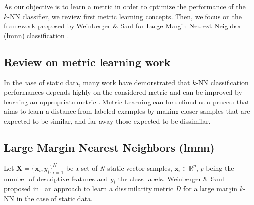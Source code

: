 As our objective is to learn a metric in order to optimize the performance of the $k$-NN classifier, we review first metric learning concepts. Then, we focus on the framework proposed by Weinberger \& Saul for Large Margin Nearest Neighbor ({\sc lmnn}) classification \cite{Weinberger2009}.

\subsection{Review on metric learning work}
In the case of static data, many work have demonstrated that $k$-NN classification performances depends highly on the considered metric and can be improved by learning an appropriate metric \cite{Shental2002,Goldberger2004,Chopra2005}. Metric Learning can be defined as a process that aims to learn a distance from labeled examples by making closer samples that are expected to be similar, and far away those expected to be dissimilar.

%


\subsection{Large Margin Nearest Neighbors ({\sc lmnn})}
\label{LMNN}
Let $\textbf{X}=\{\textbf{x}_i,y_i\}_{i=1}^N$ be a set of $N$ static vector samples, ${\textbf{x}_i \in \mathbb{R}^{p}}$, $p$ being the number of descriptive features and $y_i$ the class labels. Weinberger \& Saul proposed in~\cite{Weinberger2009} an approach to learn a dissimilarity metric $D$ for a large margin $k$-NN in the case of static data. 

